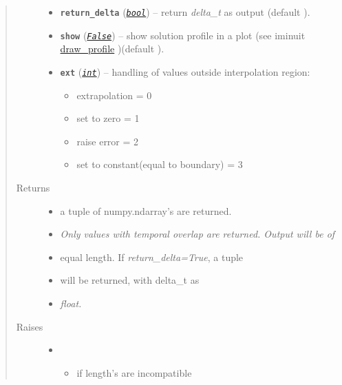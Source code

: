 \documentclass[letterpaper,10pt,english]{sphinxhowto}
\begin{document}
\begin{fulllineitems}
\begin{quote}
\begin{description}
\begin{itemize}
\item {} 
\textbf{\texttt{return\_delta}} (\href{https://docs.python.org/library/functions.html\#bool}{\emph{\texttt{bool}}}) -- return \emph{delta\_t} as output (default ).

\item {} 
\textbf{\texttt{show}} (\href{https://docs.python.org/library/constants.html\#False}{\emph{\texttt{False}}}) -- show solution profile in a plot (see iminuit \href{http://iminuit.readthedocs.org/en/latest/api.html\#iminuit.Minuit.draw\_profile}{draw\_profile}
)(default ).

\item {} 
\textbf{\texttt{ext}} (\href{https://docs.python.org/library/functions.html\#int}{\emph{\texttt{int}}}) -- 
handling of values outside interpolation region:
\begin{itemize}
\item {} 
extrapolation = 0

\item {} 
set to zero = 1

\item {} 
raise error = 2

\item {} 
set to constant(equal to boundary) = 3

\end{itemize}


\end{itemize}

\item[{Returns}] \leavevmode
\begin{itemize}
\item {} 
a tuple of numpy.ndarray's  are returned.

\item {} 
\emph{Only values with temporal overlap are returned. Output will be of}

\item {} 
equal length. If \emph{return\_delta=True}, a tuple

\item {} 
 will be returned, with delta\_t as

\item {} 
\emph{float.}

\end{itemize}


\item[{Raises}] \leavevmode\begin{itemize}
\item {} 
\begin{itemize}
\item {} 
if length's are incompatible


\end{itemize}
\end{itemize}
\end{description}
\end{quote}
\end{fulllineitems}
\end{document}
